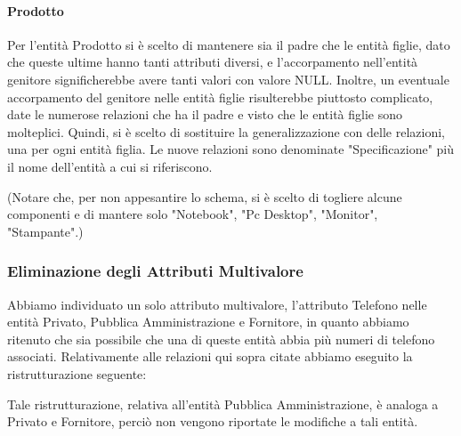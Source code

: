 \paragraph{Prodotto}
Per l'entità Prodotto si è scelto di mantenere sia il padre che le entità figlie, dato che queste ultime hanno tanti attributi diversi, e l'accorpamento nell'entità genitore significherebbe avere tanti valori con valore NULL. Inoltre, un eventuale accorpamento del genitore nelle entità figlie risulterebbe piuttosto complicato, date le numerose relazioni che ha il padre e visto che le entità figlie sono molteplici.
Quindi, si è scelto di sostituire la generalizzazione con delle relazioni, una per ogni entità figlia. Le nuove relazioni sono denominate "Specificazione" più il nome dell'entità a cui si riferiscono.

(Notare che, per non appesantire lo schema, si è scelto di togliere alcune componenti e di mantere solo "Notebook", "Pc Desktop", "Monitor", "Stampante".)




%
%
%
% 
%


\newpage
\subsubsection{Eliminazione degli Attributi Multivalore}

Abbiamo individuato un solo attributo multivalore, l'attributo Telefono nelle entità Privato, Pubblica Amministrazione e Fornitore, in quanto abbiamo ritenuto che sia possibile che una di queste entità abbia più numeri di telefono associati.
\newline
Relativamente alle relazioni qui sopra citate abbiamo eseguito la ristrutturazione seguente:
\newline\newline

\noindent{}
\newline\newline
Tale ristrutturazione, relativa all'entità Pubblica Amministrazione, è analoga a Privato e Fornitore, perciò non vengono riportate le modifiche a tali entità.
